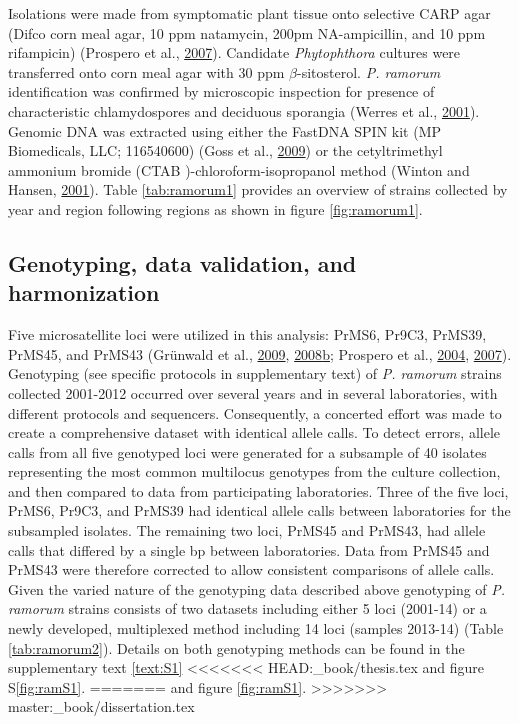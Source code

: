 \documentclass[double,12pt]{beavtex}
\begin{document}
  Isolations were made from symptomatic plant tissue onto selective CARP
  agar (Difco corn meal agar, 10 ppm natamycin, 200pm NA-ampicillin, and
  10 ppm rifampicin) (Prospero et al.,
  \protect\hyperlink{ref-prospero2007population}{2007}). Candidate
  \emph{Phytophthora} cultures were transferred onto corn meal agar with
  30 ppm \(\beta\)-sitosterol. \emph{P. ramorum} identification was
  confirmed by microscopic inspection for presence of characteristic
  chlamydospores and deciduous sporangia (Werres et al.,
  \protect\hyperlink{ref-werres2001phytophthora}{2001}). Genomic DNA was
  extracted using either the FastDNA SPIN kit (MP Biomedicals, LLC;
  116540600) (Goss et al.,
  \protect\hyperlink{ref-goss2009population}{2009}) or the cetyltrimethyl
  ammonium bromide (CTAB )-chloroform-isopropanol method (Winton and
  Hansen, \protect\hyperlink{ref-winton2001molecular}{2001}). Table
  \ref{tab:ramorum1} provides an overview of strains collected by year and
  region following regions as shown in figure \ref{fig:ramorum1}.
  
  \subsection{Genotyping, data validation, and
  harmonization}\label{genotyping-data-validation-and-harmonization}
  
  Five microsatellite loci were utilized in this analysis: PrMS6, Pr9C3,
  PrMS39, PrMS45, and PrMS43 (Grünwald et al.,
  \protect\hyperlink{ref-grunwald2009standardizing}{2009},
  \protect\hyperlink{ref-grunwald2008susceptibility}{2008}\protect\hyperlink{ref-grunwald2008susceptibility}{b};
  Prospero et al., \protect\hyperlink{ref-prospero2004isolation}{2004},
  \protect\hyperlink{ref-prospero2007population}{2007}). Genotyping (see
  specific protocols in supplementary text) of \emph{P. ramorum} strains
  collected 2001-2012 occurred over several years and in several
  laboratories, with different protocols and sequencers. Consequently, a
  concerted effort was made to create a comprehensive dataset with
  identical allele calls. To detect errors, allele calls from all five
  genotyped loci were generated for a subsample of 40 isolates
  representing the most common multilocus genotypes from the culture
  collection, and then compared to data from participating laboratories.
  Three of the five loci, PrMS6, Pr9C3, and PrMS39 had identical allele
  calls between laboratories for the subsampled isolates. The remaining
  two loci, PrMS45 and PrMS43, had allele calls that differed by a single
  bp between laboratories. Data from PrMS45 and PrMS43 were therefore
  corrected to allow consistent comparisons of allele calls. Given the
  varied nature of the genotyping data described above genotyping of
  \emph{P. ramorum} strains consists of two datasets including either 5
  loci (2001-14) or a newly developed, multiplexed method including 14
  loci (samples 2013-14) (Table \ref{tab:ramorum2}). Details on both
  genotyping methods can be found in the supplementary text \ref{text:S1}
<<<<<<< HEAD:_book/thesis.tex
  and figure S\ref{fig:ramS1}.
=======
  and figure \ref{fig:ramS1}.
>>>>>>> master:_book/dissertation.tex
  
\end{document}
